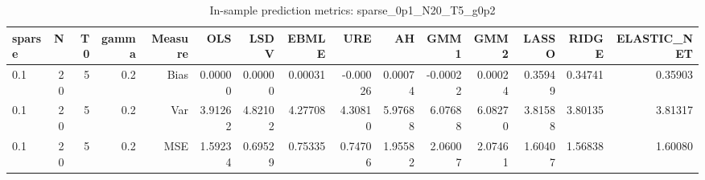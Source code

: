 \begin{table}[!htbp]\centering
\caption{In-sample prediction metrics: sparse_0p1_N20_T5_g0p2}
\label{tab:table2_sparse_0p1_N20_T5_g0p2}
\begin{tabular}{lrrrrrrrrrrrrrr}
\hline
sparse & N & T0 & gamma & Measure & OLS & LSDV & EBMLE & URE & AH & GMM1 & GMM2 & LASSO & RIDGE & ELASTIC_NET \\
\hline
0.1 & 20 & 5 & 0.2 & Bias & 0.00000 & 0.00000 & 0.00031 & -0.00026 & 0.00074 & -0.00022 & 0.00024 & 0.35949 & 0.34741 & 0.35903 \\
0.1 & 20 & 5 & 0.2 & Var & 3.91262 & 4.82102 & 4.27708 & 4.30810 & 5.97688 & 6.07688 & 6.08270 & 3.81588 & 3.80135 & 3.81317 \\
0.1 & 20 & 5 & 0.2 & MSE & 1.59234 & 0.69529 & 0.75335 & 0.74706 & 1.95582 & 2.06007 & 2.07461 & 1.60407 & 1.56838 & 1.60080 \\
\hline
\end{tabular}
\end{table}

